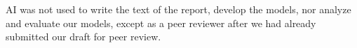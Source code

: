 \documentclass[11pt]{amsart}
\begin{document}
AI was not used to write the text of the report, develop the models, nor analyze and evaluate our models, except as a peer reviewer after we had already submitted our draft for peer review.

\FloatBarrier %
\newpage


\end{document}
